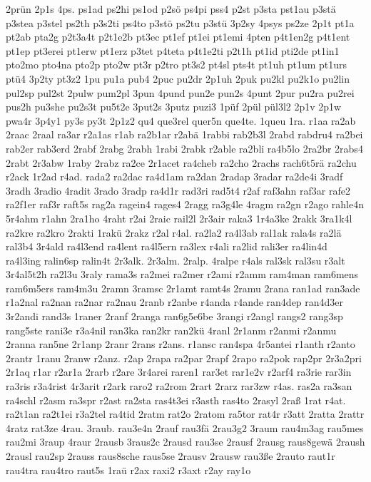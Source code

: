 {2prün
2p1s
4ps.
ps1ad
ps2hi
ps1od
p2sö
ps4pi
pss4
p2st
p3sta
pst1au
p3stä
p3stea
p3stel
ps2th
p3s2ti
ps4to
p3stö
ps2tu
p3stü
3p2sy
4psys
ps2ze
2p1t
pt1a
pt2ab
pta2g
p2t3a4t
p2t1e2b
pt3ec
pt1ef
pt1ei
pt1emi
4pten
p4t1en2g
p4t1ent
pt1ep
pt3erei
pt1erw
pt1erz
p3tet
p4teta
p4t1e2ti
p2t1h
pt1id
pti2de
pt1in1
pto2mo
pto4na
pto2p
pto2w
pt3r
p2tro
pt3s2
pt4sl
pts4t
pt1uh
pt1um
pt1urs
ptü4
3p2ty
pt3z2
1pu
pu1a
pub4
2puc
pu2dr
2p1uh
2puk
pu2kl
pu2k1o
pu2lin
pul2sp
pul2st
2pulw
pum2pl
3pun
4pund
pun2e
pun2s
4punt
2pur
pu2ra
pu2rei
pus2h
pu3she
pu2s3t
pu5t2e
3put2s
3putz
puzi3
1püf
2pül
pül3l2
2p1v
2p1w
pwa4r
3p4y1
py3s
py3t
2p1z2
qu4
que3rel
quer5n
que4te.
1queu
1ra.
r1aa
ra2ab
2raac
2raal
ra3ar
r2a1as
r1ab
ra2b1ar
r2abä
1rabbi
rab2b3l
2rabd
rabdru4
ra2bei
rab2er
rab3erd
2rabf
2rabg
2rabh
1rabi
2rabk
r2able
ra2bli
ra4b5lo
2ra2br
2rabs4
2rabt
2r3abw
1raby
2rabz
ra2ce
2r1acet
ra4cheb
ra2cho
2rachs
rach6t5rä
ra2chu
r2ack
1r2ad
r4ad.
rada2
ra2dac
ra4d1am
ra2dan
2radap
3radar
ra2de4i
3radf
3radh
3radio
4radit
3rado
3radp
ra4d1r
rad3ri
rad5t4
r2af
raf3ahn
raf3ar
rafe2
ra2f1er
raf3r
raft5s
rag2a
ragein4
rages4
2ragg
ra3g4le
4ragm
ra2gn
r2ago
rahle4n
5r4ahm
r1ahn
2ra1ho
4raht
r2ai
2raic
rail2l
2r3air
raka3
1r4a3ke
2rakk
3ra1k4l
ra2kre
ra2kro
2rakti
1rakü
2rakz
r2al
r4al.
ra2la2
ra4l3ab
ral1ak
rala4s
ra2lä
ral3b4
3r4ald
ra4l3end
ra4lent
ra4l5ern
ra3lex
r4ali
ra2lid
rali3er
ra4lin4d
ra4l3ing
ralin6sp
ralin4t
2r3alk.
2r3alm.
2ralp.
4ralpe
r4als
ral3sk
ral3su
r3alt
3r4al5t2h
ra2l3u
3raly
rama3s
ra2mei
ra2mer
r2ami
r2amm
ram4man
ram6mens
ram6m5ers
ram4m3u
2ramn
3ramsc
2r1amt
ramt4s
2ramu
2rana
ran1ad
ran3ade
r1a2nal
ra2nan
ra2nar
ra2nau
2ranb
r2anbe
r4anda
r4ande
ran4dep
ran4d3er
3r2andi
rand3s
1raner
2ranf
2ranga
ran6g5e6be
3rangi
r2angl
rangs2
rang3sp
rang5ste
rani3e
r3a4nil
ran3ka
ran2kr
ran2kü
4ranl
2r1anm
r2anmi
r2anmu
2ranna
ran5ne
2r1anp
2ranr
2rans
r2ans.
r1ansc
ran4spa
4r5antei
r1anth
r2anto
2rantr
1ranu
2ranw
r2anz.
r2ap
2rapa
ra2par
2rapf
2rapo
ra2pok
rap2pr
2r3a2pri
2r1aq
r1ar
r2ar1a
2rarb
r2are
3r4arei
raren1
rar3et
rar1e2v
r2arf4
ra3rie
rar3in
ra3ris
r3a4rist
4r3arit
r2ark
raro2
ra2rom
2rart
2rarz
rar3zw
r4as.
ras2a
ra3san
ra4schl
r2asm
ra3spr
r2ast
ra2sta
ras4t3ei
r3asth
ras4to
2rasyl
2raß
1rat
r4at.
ra2t1an
ra2t1ei
r3a2tel
ra4tid
2ratm
rat2o
2ratom
ra5tor
rat4r
r3att
2ratta
2rattr
4ratz
rat3ze
4rau.
3raub.
rau3e4n
2rauf
rau3fä
2rau3g2
3raum
rau4m3ag
rau5mes
rau2mi
3raup
4raur
2rausb
3raus2c
2rausd
rau3se
2rausf
2rausg
raus8gewä
2raush
2rausl
rau2sp
2rauss
raus8sche
raus5se
2rausv
2rausw
rau3ße
2rauto
raut1r
rau4tra
rau4tro
raut5s
1raü
r2ax
raxi2
r3axt
r2ay
ray1o
}
